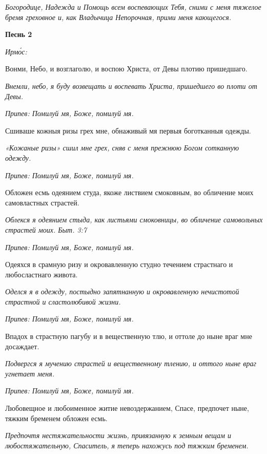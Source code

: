 \itshape Богородице, Надежда и Помощь всем воспевающих Тебя, сними с меня тяжелое бремя греховное и, как Владычица Непорочная, прими меня кающегося.\normalfont{}





\bfseries Песнь 2\normalfont{}


\itshape Ирмо́с:\normalfont{}


Вонми, Небо, и возглаголю, и воспою Христа, от Девы плотию пришедшаго.


\itshape Внемли, небо, я буду возвещать и воспевать Христа, пришедшего во плоти от Девы.\normalfont{}


\itshape Припев:\normalfont{} Помилуй мя, Боже, помилуй мя.


Сшиваше кожныя ризы грех мне, обнаживый мя первыя боготканныя одежды.


\itshape «Кожаные ризы» сшил мне грех, сняв с меня прежнюю Богом сотканную одежду.\normalfont{}


\itshape Припев:\normalfont{} Помилуй мя, Боже, помилуй мя.


Обложен есмь одеянием студа, якоже листвием смоковным, во обличение моих самовластных страстей.


\itshape Облекся я одеянием стыда, как листьями смоковницы, во обличение самовольных страстей моих. Быт. 3:7\normalfont{}


\itshape Припев:\normalfont{} Помилуй мя, Боже, помилуй мя.


Одеяхся в срамную ризу и окровавленную студно течением страстнаго и любосластнаго живота.


\itshape Оделся я в одежду, постыдно запятнанную и окровавленную нечистотой страстной и сластолюбивой жизни.\normalfont{}


\itshape Припев:\normalfont{} Помилуй мя, Боже, помилуй мя.


Впадох в страстную пагубу и в вещественную тлю, и оттоле до ныне враг мне досаждает.


\itshape Подвергся я мучению страстей и вещественному тлению, и оттого ныне враг угнетает меня.\normalfont{}


\itshape Припев:\normalfont{} Помилуй мя, Боже, помилуй мя.


Любовещное и любоименное житие невоздержанием, Спасе, предпочет ныне, тяжким бременем обложен есмь.


\itshape Предпочтя нестяжательности жизнь, привязанную к земным вещам и любостяжательную, Спаситель, я теперь нахожусь под тяжким бременем.\normalfont{}


